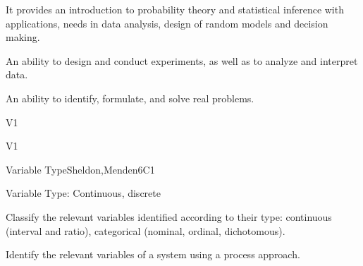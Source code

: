 
\begin{syllabus}


\begin{justification}
It provides an introduction to probability theory and statistical inference with applications, needs in data analysis, design of random models and decision making.
\end{justification}

\begin{goals}
\item An ability to design and conduct experiments, as well as to analyze and interpret data.
\item An ability to identify, formulate, and solve real problems.
\end{goals}

\begin{outcomes}{V1}
   \item {}
   \item {}
\end{outcomes}

\begin{competences}{V1}
    \item {} 
    \item {}
\end{competences}


\begin{unit}{Variable Type}{}{Sheldon,Menden}{6}{C1}
\begin{topics}
      \item Variable Type: Continuous, discrete
   \end{topics}

   \begin{learningoutcomes}
      \item Classify the relevant variables identified according to their type: continuous (interval and ratio), categorical (nominal, ordinal, dichotomous).
      \item Identify the relevant variables of a system using a process approach.
   \end{learningoutcomes}
\end{unit}


\end{syllabus}
